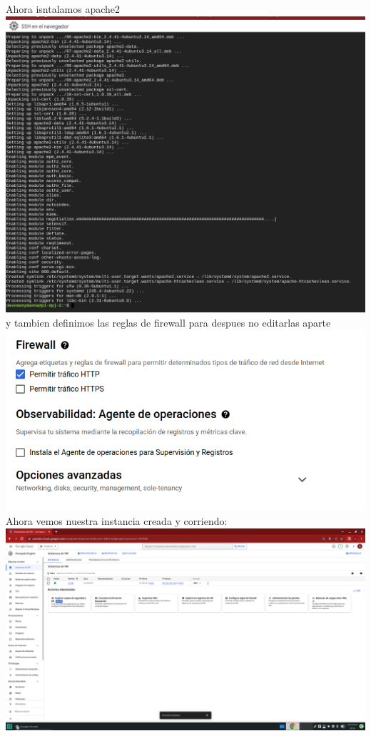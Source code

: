 \documentclass[12pt]{article}
\begin{document}
Ahora isntalamos apache2\\

\textbf{\includegraphics[scale = 0.40]{images/apache.png}}\\

y tambien definimos las reglas de firewall para despues no editarlas aparte\\

\textbf{\includegraphics[scale = 0.40]{images/firewall.png}}\\

Ahora vemos nuestra instancia creada y corriendo:\\

\textbf{\includegraphics[scale = 0.40]{images/instancia creada y corriendo.png}}\\
\end{document}
